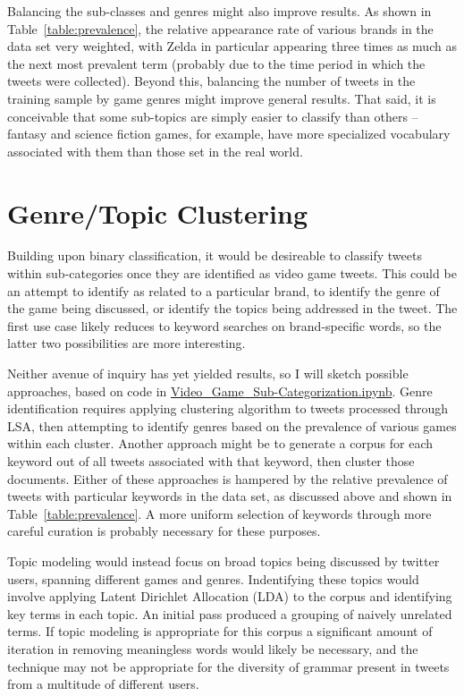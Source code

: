 \documentclass[11pt]{revtex4-1}
\newcommand{\tableref}[1]{Table~\ref{table:#1}}
\begin{document}
Balancing the sub-classes and genres might also improve results.  As
shown in \tableref{prevalence}, the relative appearance rate of
various brands in the data set very weighted, with Zelda in particular
appearing three times as much as the next most prevalent term
(probably due to the time period in which the tweets were collected).
Beyond this, balancing the number of tweets in the training sample by
game genres might improve general results.  That said, it is
conceivable that some sub-topics are simply easier to classify than
others -- fantasy and science fiction games, for example, have more
specialized vocabulary associated with them than those set in the real
world.

\section{Genre/Topic Clustering}
\label{sec:clustering}

Building upon binary classification, it would be desireable to
classify tweets within sub-categories once they are identified as
video game tweets.  This could be an attempt to identify as related to
a particular brand, to identify the genre of the game being discussed,
or identify the topics being addressed in the tweet.  The first use
case likely reduces to keyword searches on brand-specific words, so
the latter two possibilities are more interesting.

Neither avenue of inquiry has yet yielded results, so I will sketch
possible approaches, based on code in
\href{https://github.com/davidsanford/DSI_Capstone/Video_Game_Sub-Categorization.ipynb}{Video\_Game\_Sub-Categorization.ipynb}.
Genre identification requires applying clustering algorithm to tweets
processed through LSA, then attempting to identify genres based on the
prevalence of various games within each cluster.  Another approach
might be to generate a corpus for each keyword out of all tweets
associated with that keyword, then cluster those documents.  Either of
these approaches is hampered by the relative prevalence of tweets with
particular keywords in the data set, as discussed above and shown in
\tableref{prevalence}.  A more uniform selection of keywords through
more careful curation is probably necessary for these purposes.




Topic modeling would instead focus on broad topics being discussed by
twitter users, spanning different games and genres.  Indentifying
these topics would involve applying Latent Dirichlet Allocation (LDA)
to the corpus and identifying key terms in each topic.  An initial
pass produced a grouping of naively unrelated terms.  If topic
modeling is appropriate for this corpus a significant amount of
iteration in removing meaningless words would likely be necessary, and
the technique may not be appropriate for the diversity of grammar
present in tweets from a multitude of different users.
\end{document}
